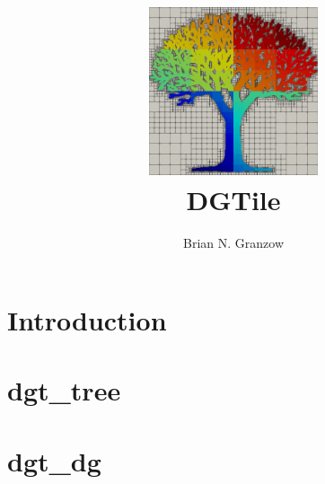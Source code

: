 \documentclass[12pt]{report}
\title{\includegraphics[width=5cm]{../logo.png}\\DGTile}
\author{Brian N. Granzow}
\date{}
\begin{document}
\maketitle
\chapter{Introduction}
\chapter{dgt\_tree}

\chapter{dgt\_dg}

\end{document}
